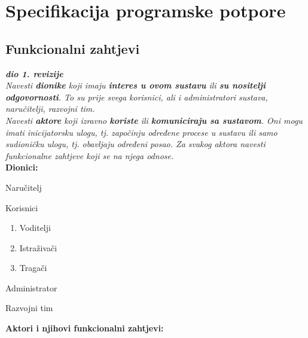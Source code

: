 \chapter{Specifikacija programske potpore}
		
	\section{Funkcionalni zahtjevi}
			
			\textbf{\textit{dio 1. revizije}}\\
			
			\textit{Navesti \textbf{dionike} koji imaju \textbf{interes u ovom sustavu} ili  \textbf{su nositelji odgovornosti}. To su prije svega korisnici, ali i administratori sustava, naručitelji, razvojni tim.}\\
				
			\textit{Navesti \textbf{aktore} koji izravno \textbf{koriste} ili \textbf{komuniciraju sa sustavom}. Oni mogu imati inicijatorsku ulogu, tj. započinju određene procese u sustavu ili samo sudioničku ulogu, tj. obavljaju određeni posao. Za svakog aktora navesti funkcionalne zahtjeve koji se na njega odnose.}\\
			
			
			\noindent \textbf{Dionici:}
			
			\begin{packed_enum}
				
				\item Naručitelj
				\item Korisnici
				\begin{enumerate}
					\item Voditelji
					\item Istraživači
					\item  Tragači
				\end{enumerate}		
				\item Administrator
				\item Razvojni tim 
				
			\end{packed_enum}
			
			\noindent \textbf{Aktori i njihovi funkcionalni zahtjevi:}
			
